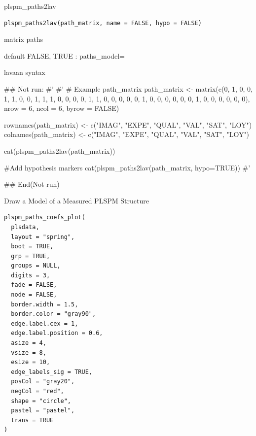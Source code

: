 \documentclass[a4paper]{book}
\begin{document}
%
\begin{Description}
plspm\_paths2lav
\end{Description}
%
\begin{Usage}
\begin{verbatim}
plspm_paths2lav(path_matrix, name = FALSE, hypo = FALSE)
\end{verbatim}
\end{Usage}
%
\begin{Arguments}
\begin{ldescription}
\item[\code{path\_matrix}] matrix paths

\item[\code{name}] default FALSE, TRUE : paths\_model=
\end{ldescription}
\end{Arguments}
%
\begin{Value}
lavaan syntax
\end{Value}
%
\begin{Examples}
\begin{ExampleCode}
## Not run: 
#'
#' # Example path_matrix
path_matrix <- matrix(c(0, 1, 0, 0, 1, 1,
                        0, 0, 1, 1, 1, 0,
                        0, 0, 0, 1, 1, 0,
                        0, 0, 0, 0, 1, 0,
                        0, 0, 0, 0, 0, 1,
                        0, 0, 0, 0, 0, 0),
                      nrow = 6, ncol = 6, byrow = FALSE)

rownames(path_matrix) <- c("IMAG", "EXPE", "QUAL", "VAL", "SAT", "LOY")
colnames(path_matrix) <- c("IMAG", "EXPE", "QUAL", "VAL", "SAT", "LOY")

cat(plspm_paths2lav(path_matrix))

#Add hypothesis markers
cat(plspm_paths2lav(path_matrix, hypo=TRUE))
#'

## End(Not run)
\end{ExampleCode}
\end{Examples}
%
\begin{Description}
Draw a Model of a Measured PLSPM Structure
\end{Description}
%
\begin{Usage}
\begin{verbatim}
plspm_paths_coefs_plot(
  plsdata,
  layout = "spring",
  boot = TRUE,
  grp = TRUE,
  groups = NULL,
  digits = 3,
  fade = FALSE,
  node = FALSE,
  border.width = 1.5,
  border.color = "gray90",
  edge.label.cex = 1,
  edge.label.position = 0.6,
  asize = 4,
  vsize = 8,
  esize = 10,
  edge_labels_sig = TRUE,
  posCol = "gray20",
  negCol = "red",
  shape = "circle",
  pastel = "pastel",
  trans = TRUE
)
\end{verbatim}
\end{Usage}
\end{document}
